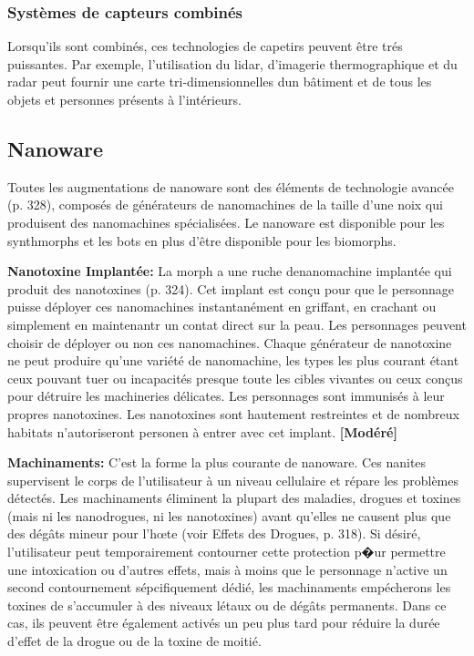 \subsubsection{Systèmes de capteurs combinés} 

Lorsqu'ils sont combinés, ces technologies de capetirs peuvent être trés puissantes. Par exemple, l'utilisation du lidar, d'imagerie thermographique et du radar peut fournir une carte tri-dimensionnelles dun bâtiment et de tous les objets et personnes présents à l'intérieurs. 



\subsection{Nanoware} \label{sec:nanoware} 

Toutes les augmentations de nanoware sont des éléments de technologie avancée (p. 328), composés de générateurs de nanomachines de la taille d'une noix qui produisent des nanomachines spécialisées. Le nanoware est disponible pour les synthmorphs et les bots en plus d'être disponible pour les biomorphs. 

\textbf{Nanotoxine Implantée:} La morph a une ruche denanomachine implantée qui produit des nanotoxines (p. 324). Cet implant est conçu pour que le personnage puisse déployer ces nanomachines instantanément en griffant, en crachant ou simplement en maintenantr un contat direct sur la peau. Les personnages peuvent choisir de déployer ou non ces nanomachines. Chaque générateur de nanotoxine ne peut produire qu'une variété de nanomachine, les types les plus courant étant ceux pouvant tuer ou incapacités presque toute les cibles vivantes ou ceux conçus pour détruire les machineries délicates. Les personnages sont immunisés à leur propres nanotoxines. Les nanotoxines sont hautement restreintes et de nombreux habitats n'autoriseront personen à entrer avec cet implant. \textbf{[Modéré]} 

\textbf{Machinaments:} C'est la forme la plus courante de nanoware. Ces nanites supervisent le corps de l'utilisateur à un niveau cellulaire et répare les problèmes détectés. Les machinaments éliminent la plupart des maladies, drogues et toxines (mais ni les nanodrogues, ni les nanotoxines) avant qu'elles ne causent plus que des dégâts mineur pour l'hœte (voir Effets des Drogues, p. 318). Si désiré, l'utilisateur peut temporairement contourner cette protection p�ur permettre une intoxication ou d'autres effets, mais à moins que le personnage n'active un second contournement sépcifiquement dédié, les machinaments empécherons les toxines de s'accumuler à des niveaux létaux ou de dégâts permanents. Dans ce cas, ils peuvent être également activés un peu plus tard pour réduire la durée d'effet de la drogue ou de la toxine de moitié. 

